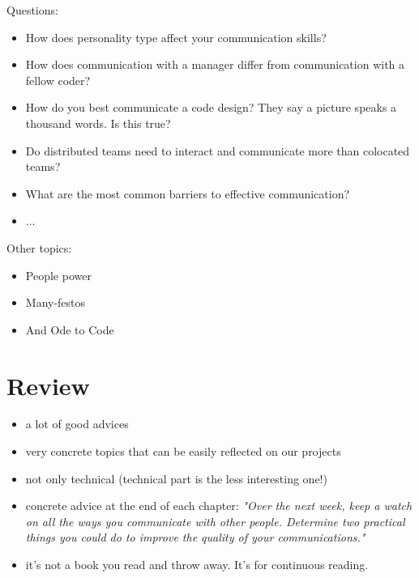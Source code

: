 \documentclass{mypresentation}
\begin{document}
Questions:
\begin{itemize}
\item How does personality type affect your communication skills?
\item How does communication with a manager differ from communication with a fellow coder?
\item How do you best communicate a code design? They say a picture speaks a thousand words. Is this true?
\item Do distributed teams need to interact and communicate more than colocated teams?
\item What are the most common barriers to effective communication?
\item ...
\end{itemize}
\newpage

Other topics:
\begin{itemize}
\item People power
\item Many-festos
\item And Ode to Code
\end{itemize}
\newpage

\section{Review}
\begin{itemize}
\item a lot of good advices
\item very concrete topics that can be easily reflected on our projects
\item not only technical (technical part is the less interesting one!)
\item concrete advice at the end of each chapter: \textit{"Over the next week, keep a watch on all the ways you communicate with other people. Determine two practical things you could do to improve the quality of your communications."}
\item it's not a book you read and throw away. It's for continuous reading.
\end{itemize}
\newpage

\end{document}
